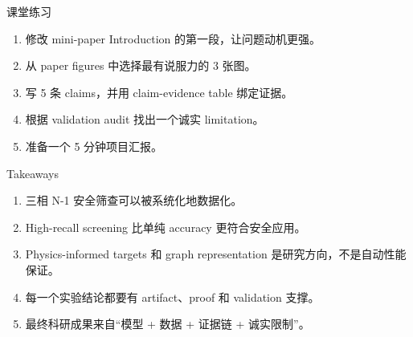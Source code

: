 \documentclass[aspectratio=169,11pt]{beamer}
\begin{document}
\begin{frame}{课堂练习}
\begin{enumerate}
  \item 修改 mini-paper Introduction 的第一段，让问题动机更强。
  \item 从 paper figures 中选择最有说服力的 3 张图。
  \item 写 5 条 claims，并用 claim-evidence table 绑定证据。
  \item 根据 validation audit 找出一个诚实 limitation。
  \item 准备一个 5 分钟项目汇报。
\end{enumerate}
\end{frame}

\begin{frame}{Takeaways}
\begin{enumerate}
  \item 三相 N-1 安全筛查可以被系统化地数据化。
  \item High-recall screening 比单纯 accuracy 更符合安全应用。
  \item Physics-informed targets 和 graph representation 是研究方向，不是自动性能保证。
  \item 每一个实验结论都要有 artifact、proof 和 validation 支撑。
  \item 最终科研成果来自“模型 + 数据 + 证据链 + 诚实限制”。
\end{enumerate}
\end{frame}
\end{document}
